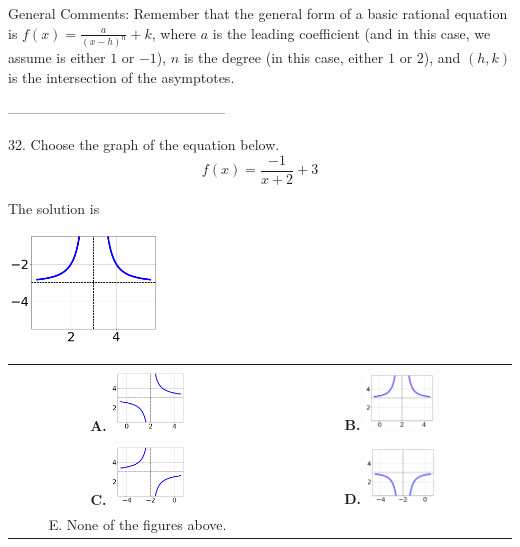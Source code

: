 \documentclass{extbook}[14pt]
\begin{document}
General Comments: Remember that the general form of a basic rational equation is $ f(x) = \frac{a}{(x-h)^n} + k$, where $a$ is the leading coefficient (and in this case, we assume is either $1$ or $-1$), $n$ is the degree (in this case, either $1$ or $2$), and $(h, k)$ is the intersection of the asymptotes.

-----------------------------------------------

32. Choose the graph of the equation below.
\[ f(x) = \frac{-1}{x + 2} + 3 \] 

 
 The solution is  
 \begin{center} \includegraphics[width=0.3\textwidth]{../Figures/rationalEquationToGraphAC.png} \end{center}\begin{tabular}{|c|c|} 
\hline 
 & \tabularnewline 
 \textbf{A.} \includegraphics[width=0.3\textwidth]{../Figures/rationalEquationToGraphAA.png} & \textbf{B.} \includegraphics[width=0.3\textwidth]{../Figures/rationalEquationToGraphBA.png} \tabularnewline 
\hline 
 & \tabularnewline 
 \textbf{C.} \includegraphics[width=0.3\textwidth]{../Figures/rationalEquationToGraphCA.png} & \textbf{D.} \includegraphics[width=0.3\textwidth]{../Figures/rationalEquationToGraphDA.png} \tabularnewline 
\hline 
 E. None of the figures above. & \tabularnewline 
\hline 
 \end{tabular} 
 
\end{document}
